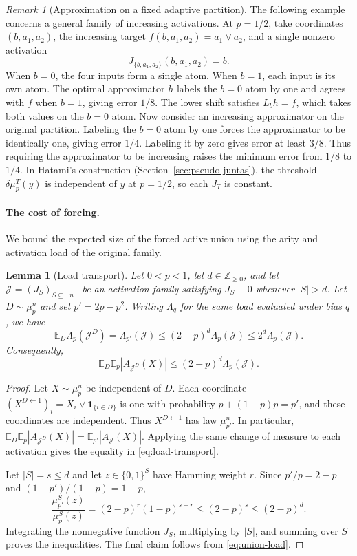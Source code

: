 \documentclass[11pt,letterpaper]{article}
\newtheorem{lemma}[theorem]{Lemma}
\theoremstyle{definition}
\theoremstyle{remark}
\newtheorem{remark}[theorem]{Remark}
\newcommand{\bits}{\{0,1\}}
\newcommand{\E}{\mathbb E}
\newcommand{\one}{\mathbf 1}
\newcommand{\cJ}{\mathcal J}
\begin{document}
\begin{remark}[Approximation on a fixed adaptive partition]
\label{rem:adaptive-obstruction}
The following example concerns a general family of increasing activations.
At $p=1/2$, take coordinates $(b,a_1,a_2)$, the increasing target
$f(b,a_1,a_2)=a_1\vee a_2$, and a single nonzero activation
\[
       J_{\{b,a_1,a_2\}}(b,a_1,a_2)=b.
\]
When $b=0$, the four inputs form a single atom.  When $b=1$, each input is
its own atom.  The optimal approximator $h$ labels the $b=0$ atom by one
and agrees with $f$ when $b=1$, giving error $1/8$.  The lower shift
satisfies $L_bh=f$, which takes both values on the $b=0$ atom.  Now consider
an increasing approximator on the original partition.  Labeling the $b=0$
atom by one forces the approximator to be identically one, giving error
$1/4$.  Labeling it by zero gives error at least $3/8$.  Thus requiring the
approximator to be increasing raises the minimum error from $1/8$ to $1/4$.
In Hatami's construction (Section~\ref{sec:pseudo-juntas}), the threshold
$\delta\mu_p^T(y)$ is independent of $y$ at $p=1/2$, so each $J_T$ is constant.
\end{remark}

\paragraph{The cost of forcing.}
We bound the expected size of the forced active union using the arity and
activation load of the original family.

\begin{lemma}[Load transport]
\label{lem:load-transport}
Let $0<p<1$, let $d\in\mathbb Z_{\ge0}$, and let
$\cJ=(J_S)_{S\subseteq[n]}$ be an activation family satisfying
$J_S\equiv0$ whenever $|S|>d$.  Let $D\sim\mu_p^n$ and set $p'=2p-p^2$.
Writing $\Lambda_q$ for the same load evaluated under bias $q$, we have
\begin{equation}
\label{eq:load-transport}
       \E_D\Lambda_p(\cJ^D)
       =\Lambda_{p'}(\cJ)
       \le(2-p)^d\Lambda_p(\cJ)
       \le2^d\Lambda_p(\cJ).
\end{equation}
Consequently,
\[
       \E_D\E_p|A_{\cJ^D}(X)|
       \le(2-p)^d\Lambda_p(\cJ).
\]
\end{lemma}

\begin{proof}
Let $X\sim\mu_p^n$ be independent of $D$.  Each coordinate $(X^{D\leftarrow1})_i=X_i\vee\one_{\{i\in D\}}$
is one with probability $p+(1-p)p=p'$, and these coordinates are independent.
Thus $X^{D\leftarrow1}$ has law $\mu_{p'}^n$.  In particular,
$\E_D\E_p|A_{\cJ^D}(X)|=\E_{p'}|A_{\cJ}(X)|$.
Applying the same change of measure to each activation gives the equality
in \eqref{eq:load-transport}.

Let $|S|=s\le d$ and let $z\in\bits^S$ have Hamming weight $r$.  Since
$p'/p=2-p$ and $(1-p')/(1-p)=1-p$,
\[
  \frac{\mu_{p'}^S(z)}{\mu_p^S(z)}
  =(2-p)^r(1-p)^{s-r}
  \le(2-p)^s\le(2-p)^d.
\]
Integrating the nonnegative function $J_S$, multiplying by $|S|$, and summing
over $S$ proves the inequalities.  The final claim follows from
\eqref{eq:union-load}.
\end{proof}
\end{document}
